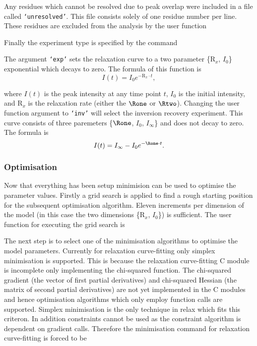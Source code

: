 
Any residues which cannot be resolved due to peak overlap were included in a file called \texttt{`unresolved'}.  This file consists solely of one residue number per line.  These residues are excluded from the analysis by the user function


Finally the experiment type is specified by the command


The argument \texttt{`exp'} sets the relaxation curve to a two parameter \{$\mathrm{R}_x$, $I_0$\} exponential which decays to zero.  The formula of this function is
\begin{equation}
 I(t) = I_0 e^{-\mathrm{R}_x \cdot t},
\end{equation}

\noindent where $I(t)$ is the peak intensity at any time point $t$, $I_0$ is the initial intensity, and $\mathrm{R}_x$ is the relaxation rate (either the $\Rone$ or $\Rtwo$).  Changing the user function argument to \texttt{`inv'} will select the inversion recovery experiment.  This curve consists of three paremeters \{$\Rone$, $I_0$, $I_{\infty}$\} and does not decay to zero.  The formula is
\begin{equation}
 I(t) = I_{\infty} - I_0 e^{-\Rone \cdot t}.
\end{equation}


\subsubsection{Optimisation}

Now that everything has been setup minimision can be used to optimise the parameter values.  Firstly a grid search is applied to find a rough starting position for the subsequent optimisation algorithm.  Eleven increments per dimension of the model (in this case the two dimensions \{$\mathrm{R}_x$, $I_0$\}) is sufficient.  The user function for executing the grid search is


The next step is to select one of the minimisation algorithms to optimise the model parameters.  Currently for relaxation curve-fitting only simplex minimisation is supported.  This is because the relaxation curve-fitting C module is incomplete only implementing the chi-squared function.  The chi-squared gradient (the vector of first partial derivatives) and chi-squared Hessian (the matrix of second partial derivatives) are not yet implemented in the C modules and hence optimisation algorithms which only employ function calls are supported.  Simplex minimisation is the only technique in relax which fits this criteron.  In addition constraints cannot be used as the constraint algorithm is dependent on gradient calls.  Therefore the minimisation command for relaxation curve-fitting is forced to be

